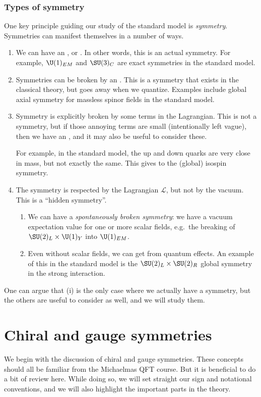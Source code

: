\documentclass[a4paper]{article}
\begin{document}
\subsubsection*{Types of symmetry}
One key principle guiding our study of the standard model is \emph{symmetry}. Symmetries can manifest themselves in a number of ways.
\begin{enumerate}
  \item We can have an , or . In other words, this is an actual symmetry. For example, $\U(1)_{EM}$ and $\SU(3)_C$ are exact symmetries in the standard model.
  \item Symmetries can be broken by an . This is a symmetry that exists in the classical theory, but goes away when we quantize. Examples include global axial symmetry for massless spinor fields in the standard model.
  \item Symmetry is explicitly broken by some terms in the Lagrangian. This is not a symmetry, but if those annoying terms are small (intentionally left vague), then we have an , and it may also be useful to consider these.

    For example, in the standard model, the up and down quarks are very close in mass, but not exactly the same. This gives to the (global) isospin symmetry.
  \item The symmetry is respected by the Lagrangian $\mathcal{L}$, but not by the vacuum. This is a ``hidden symmetry''.
    \begin{enumerate}
      \item We can have a \emph{spontaneously broken symmetry}: we have a vacuum expectation value for one or more scalar fields, e.g.\ the breaking of $\SU(2)_L \times \U(1)_Y$ into $\U(1)_{EM}$.
      \item Even without scalar fields, we can get  from quantum effects. An example of this in the standard model is the $\SU(2)_L \times \SU(2)_R$ global symmetry in the strong interaction.
    \end{enumerate}
\end{enumerate}
One can argue that (i) is the only case where we actually have a symmetry, but the others are useful to consider as well, and we will study them.

\section{Chiral and gauge symmetries}
We begin with the discussion of chiral and gauge symmetries. These concepts should all be familiar from the Michaelmas QFT course. But it is beneficial to do a bit of review here. While doing so, we will set straight our sign and notational conventions, and we will also highlight the important parts in the theory.
\end{document}
